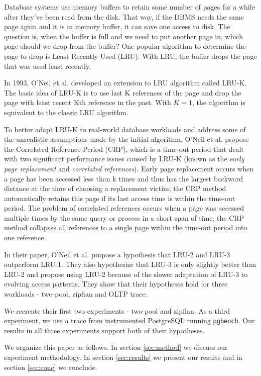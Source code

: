 Database systems use memory buffers to retain some number of pages for a while after they've been read from the disk. That way, if the DBMS needs the same page again and it is in memory buffer, it can save one access to disk. The question is, when the buffer is full and we need to put another page in, which page should we drop from the buffer? One popular algorithm to determine the page to drop is Least Recently Used (LRU). With LRU, the buffer drops the page that was used least recently.

In 1993, O'Neil et al. \cite{lruk} developed an extension to LRU algorithm called LRU-K. The basic idea of LRU-K is to use last K references of the page and drop the page with least recent Kth reference in the past. With $K = 1$, the algorithm is equivalent to the classic LRU algorithm.

To better adapt LRU-K to real-world database workloads and address some of the unrealistic assumptions made by the initial algorithm, O'Neil et al. propose the Correlated Reference Period (CRP), which is a time-out period that dealt with two significant performance issues caused by LRU-K (known as the \emph{early page replacement} and \emph{correlated references}). Early page replacement occurs when a page has been accessed less than k times and thus has the largest backward distance at the time of choosing a replacement victim; the CRP method automatically retains this page if its last access time is within the time-out period. The problem of correlated references occurs when a page was accessed multiple times by the same query or process in a short span of time, the CRP method collapses all references to a single page within the time-out period into one reference.

In their paper, O'Neil et al. propose a hypothesis that LRU-2 and LRU-3 outperform LRU-1. They also hypothesize that LRU-3 is only slightly better than LRU-2 and propose using LRU-2 because of the slower adaptation of LRU-3 to evolving access patterns. They show that their hypotheses hold for three workloads - two-pool, zipfian and OLTP trace.

We recreate their first two experiments - two-pool and zipfian. As a third experiment, we use a trace from instrumented PostgreSQL running \texttt{pgbench}. Our results in all three experiments support both of their hypotheses.

We organize this paper as follows. In section \ref{sec:method} we discuss our experiment methodology. In section \ref{sec:results} we present our results and in section \ref{sec:conc} we conclude.
